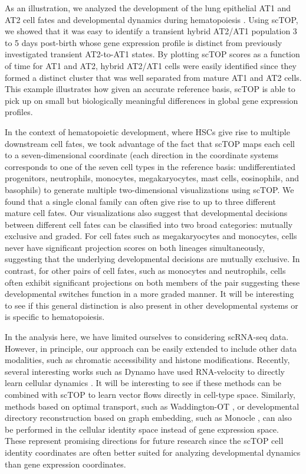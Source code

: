 \documentclass[aps,superscriptaddress, notitlepage,longbibliography]{revtex4-1}
\begin{document}
As an illustration, we analyzed the development of the lung epithelial AT1 and AT2 cell fates \cite{zepp2021genomic} and developmental dynamics during hematopoiesis  \cite{weinreb_lineage_2020}. Using scTOP, we showed that it was easy to identify a transient hybrid AT2/AT1 population 3 to 5 days post-birth whose gene expression profile is distinct from previously investigated transient AT2-to-AT1 states. By plotting scTOP scores as a function of time for AT1 and AT2, hybrid AT2/AT1 cells were easily identified since they formed a distinct cluster that was well separated from mature AT1 and AT2 cells. This example illustrates how given an accurate reference basis, scTOP is able to pick up on small but biologically meaningful differences in global gene expression profiles.

In the context of hematopoietic development, where HSCs give rise to multiple downstream cell fates, we took advantage of the fact that scTOP maps each cell to a seven-dimensional coordinate (each direction in the coordinate systems corresponds to one of the seven cell types in the reference basis: undifferentiated progenitors, neutrophils, monocytes, megakaryocytes, mast cells, eosinophils, and basophils) to generate multiple two-dimensional visualizations using scTOP. We found that a single clonal family can often give rise to up to three different mature cell fates. Our visualizations also suggest that developmental decisions between different cell fates can be classified into two broad categories: mutually exclusive and graded. For cell fates such as megakaryocytes and monocytes, cells never have significant projection scores on both lineages simultaneously, suggesting that the underlying developmental decisions are mutually exclusive. In contrast, for other pairs of cell fates, such as monocytes and neutrophils, cells often exhibit significant projections on both members of the pair suggesting these developmental switches function in a more graded manner. It will be interesting to see if this general distinction is also present in other developmental systems or is specific to hematopoiesis.

In the analysis here, we have limited ourselves to considering scRNA-seq data. However, in principle, our approach can be easily extended to include other data modalities, such as chromatic accessibility and histone modifications. Recently, several interesting works such as Dynamo have used RNA-velocity to directly learn cellular dynamics \cite{xing2022reconstructing, qiu2022mapping}. It will be interesting to see if these methods can be combined with scTOP to learn vector flows directly in cell-type space. Similarly, methods based on optimal transport, such as Waddington-OT \cite{schiebinger2019optimal}, or developmental directory reconstruction based on graph embedding, such as Monocle \cite{qiu2017reversed}, can also be performed in the cellular identity space instead of gene expression space. These represent promising directions for future research since the scTOP cell identity coordinates are often better suited for analyzing developmental dynamics than gene expression coordinates.
\end{document}
